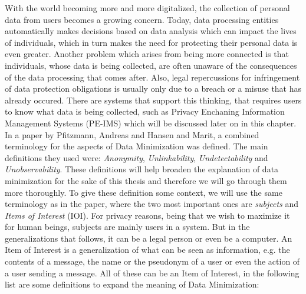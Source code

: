 With the world becoming more and more digitalized, the collection of personal data from users becomes a growing concern. Today, data processing entities automatically makes decisions based on data analysis which can impact the lives of individuals, which in turn makes the need for protecting their personal data is even greater.\cite{danezis2015privacy} Another problem which arises from being more connected is that individuals, whose data is being collected, are often unaware of the consequences of the data processing that comes after. Also, legal repercussions for infringement of data protection obligations is usually only due to a breach or a misuse that has already occured. There are systems that support this thinking, that requires users to know what data is being collected, such as Privacy Enchaning Information Management Systems (PE-IMS) which will be discussed later on in this chapter. \\




In a paper by Pfitzmann, Andreas and Hansen and Marit, a combined terminology for the aspects of Data Minimization was defined. The main definitions they used were: \textit{Anonymity}, \textit{Unlinkability}, \textit{Undetectability} and \textit{Unobservability}.\cite{pfitzmann2010} These definitions will help broaden the explanation of data minimization for the sake of this thesis and therefore we will go through them more thoroughly. To give these definition some context, we will use the same terminology as in the paper, where the two most important ones are \textit{subjects} and \textit{Items of Interest} (IOI). For privacy reasons, being that we wish to maximize it for human beings, subjects are mainly users in a system. But in the generalizations that follows, it can be a legal person or even be a computer. An Item of Interest is a generalization of what can be seen as information, e.g. the contents of a message, the name or the pseudonym of a user or even the action of a user sending a message. All of these can be an Item of Interest, in the following list are some definitions to expand the meaning of Data Minimization: \\

